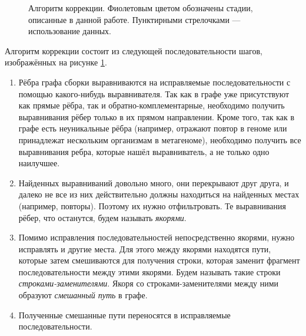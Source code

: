 \documentclass[14pt]{matmex-diploma-custom}
\begin{document}
\begin{figure}[h]
    \centering
{}
\caption{Алгоритм коррекции. Фиолетовым цветом обозначены стадии, описанные в данной работе. Пунктирными стрелочками --- использование данных.}
\label{fig:pipeline}
\end{figure}

Алгоритм коррекции состоит из следующей последовательности шагов, изображённых на рисунке \ref{fig:pipeline}.
\begin{enumerate}
    \item Рёбра графа сборки выравниваются на исправляемые последовательности с помощью какого-нибудь выравнивателя. Так как в графе уже присутствуют как прямые рёбра, так и обратно-комплементарные, необходимо получить выравнивания рёбер только в их прямом направлении. Кроме того, так как в графе есть неуникальные рёбра (например, отражают повтор в геноме или принадлежат нескольким организмам в метагеноме), необходимо получить все выравнивания ребра, которые нашёл выравниватель, а не только одно наилучшее.
    \item Найденных выравниваний довольно много, они перекрывают друг друга, и далеко не все из них действительно должны находиться на найденных местах (например, повторы). Поэтому их нужно отфильтровать. Те выравнивания рёбер, что останутся, будем называть \textit{якорями}.
    \item Помимо исправления последовательностей непосредственно якорями, нужно исправлять и другие места. Для этого между якорями находятся пути, которые затем смешиваются для получения строки, которая заменит фрагмент последовательности между этими якорями. Будем называть такие строки \textit{строками-заменителями}. Якоря со строками-заменителями между ними образуют \textit{смешанный путь} в графе.
    \item Полученные смешанные пути переносятся в исправляемые последовательности.
\end{enumerate}
\end{document}
